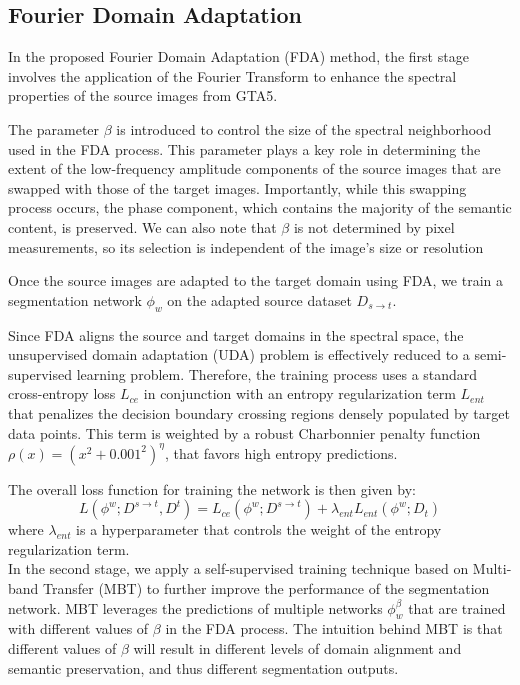 \documentclass[10pt,twocolumn,letterpaper]{article}
\begin{document}

\subsection{Fourier Domain Adaptation}

In the proposed Fourier Domain Adaptation (FDA) method\cite{fda}, the first stage involves the application of the Fourier Transform to enhance the spectral properties of the source images from GTA5.

The parameter $\beta$ is introduced to control the size of the spectral neighborhood used in the FDA process. This parameter plays a key role in determining the extent of the low-frequency amplitude components of the source images that are swapped with those of the target images. Importantly, while this swapping process occurs, the phase component, which contains the majority of the semantic content, is preserved. We can also note that $\beta$ is not determined by pixel measurements, so its selection is independent of the image’s size or resolution

Once the source images are adapted to the target domain using FDA, we train a segmentation network $\phi_w$ on the adapted source dataset $D_{s \rightarrow t}$. 

Since FDA aligns the source and target domains in the spectral space, the unsupervised domain adaptation (UDA) problem is effectively reduced to a semi-supervised learning problem. Therefore, the training process uses a standard cross-entropy loss $L_{ce}$ in conjunction with an entropy regularization term $L_{ent}$ that penalizes the decision boundary crossing regions densely populated by target data points. This term is weighted by a robust Charbonnier penalty function $\rho(x) = (x^2 + 0.001^2)^{\eta}$, that favors high entropy predictions.

The overall loss function for training the network is then given by:
\begin{equation}
  L(\phi^w; D^{s \rightarrow t}, D^t) = L_{ce}(\phi^w; D^{s \rightarrow t}) + \lambda_{ent} L_{ent}(\phi^w; D_t)
\label{eq:overall_loss}
\end{equation}
where $\lambda_{ent}$ is a hyperparameter that controls the weight of the entropy regularization term.\\

In the second stage, we apply a self-supervised training technique based on Multi-band Transfer (MBT) to further improve the performance of the segmentation network. MBT leverages the predictions of multiple networks $\phi_w^{\beta}$ that are trained with different values of $\beta$ in the FDA process. The intuition behind MBT is that different values of $\beta$ will result in different levels of domain alignment and semantic preservation, and thus different segmentation outputs.
\end{document}
